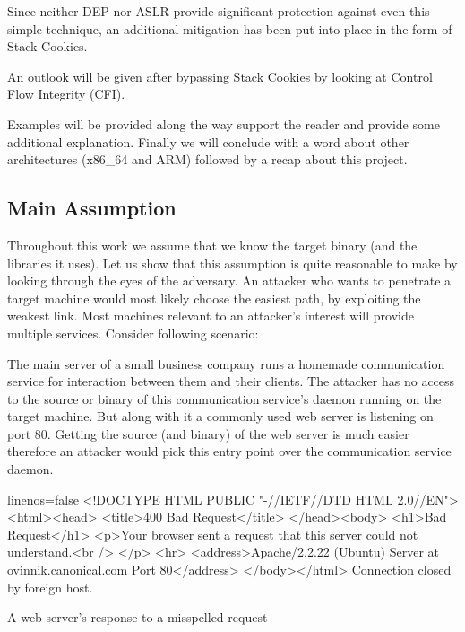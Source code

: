 \documentclass[article]{uibk}
\begin{document}
Since neither DEP nor ASLR provide significant protection against even this
simple technique, an additional mitigation has been put into place in the form
of Stack Cookies.

An outlook will be given after bypassing Stack Cookies by looking at Control
Flow Integrity (CFI).

Examples will be provided along the way support the reader and provide some
additional explanation. Finally we will conclude with a word about other
architectures (x86\_64 and ARM) followed by a recap about this project.

\subsection{Main Assumption}

Throughout this work we assume that we know the target binary (and the
libraries it uses). Let us show that this assumption is quite reasonable to
make by looking through the eyes of the adversary. An attacker who wants to
penetrate a target machine would most likely choose the easiest path, by
exploiting the weakest link. Most machines relevant to an attacker's interest
will provide multiple services. Consider following scenario:

The main server of a small business company runs a homemade communication
service for interaction between them and their clients. The attacker has no
access to the source or binary of this communication service's daemon running
on the target machine. But along with it a commonly used web server is
listening on port 80. Getting the source (and binary) of the web server is much
easier therefore an attacker would pick this entry point over the communication
service daemon.

\begin{listing}[h!]
    \begin{code*}{linenos=false}
        <!DOCTYPE HTML PUBLIC "-//IETF//DTD HTML 2.0//EN">
        <html><head>
        <title>400 Bad Request</title>
        </head><body>
        <h1>Bad Request</h1>
        <p>Your browser sent a request that this server could not understand.<br />
        </p>
        <hr>
        <address>Apache/2.2.22 (Ubuntu) Server at ovinnik.canonical.com Port 80</address>
        </body></html>
        Connection closed by foreign host.
    \end{code*}
    \caption{A web server's response to a misspelled request}
    \label{src:http_response}
\end{listing}
\end{document}
